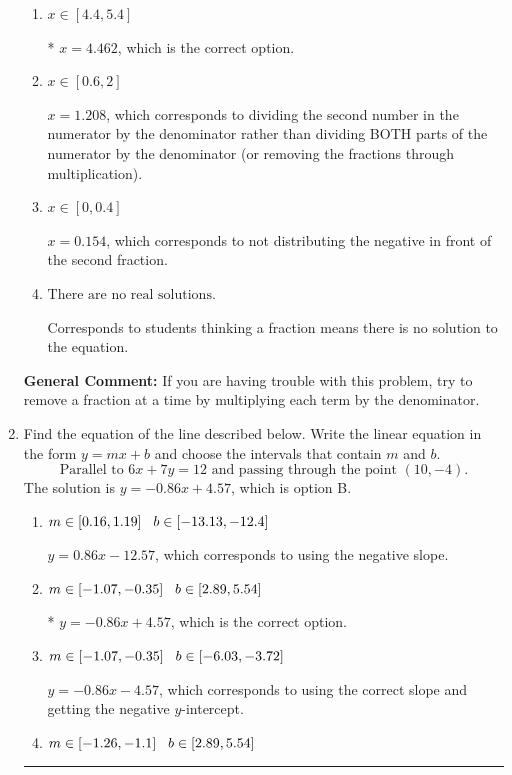 \documentclass{extbook}[14pt]
\newcommand{\litem}[1]{\item #1

\rule{\textwidth}{0.4pt}}
\begin{document}
\begin{enumerate}
{\begin{enumerate}[label=\Alph*.]
 $x = 8.308$, which corresponds to dividing the coefficients in front of x by the denominator rather than dividing BOTH parts of the numerator by the denominator (or removing the fractions through multiplication).
\item \( x \in [4.4, 5.4] \)

* $x = 4.462$, which is the correct option.
\item \( x \in [0.6, 2] \)

 $x = 1.208$, which corresponds to dividing the second number in the numerator by the denominator rather than dividing BOTH parts of the numerator by the denominator (or removing the fractions through multiplication).
\item \( x \in [0, 0.4] \)

 $x = 0.154$, which corresponds to not distributing the negative in front of the second fraction.
\item \( \text{There are no real solutions.} \)

Corresponds to students thinking a fraction means there is no solution to the equation.
\end{enumerate}

\textbf{General Comment:} If you are having trouble with this problem, try to remove a fraction at a time by multiplying each term by the denominator.
}
\litem{
Find the equation of the line described below. Write the linear equation in the form $ y=mx+b $ and choose the intervals that contain $m$ and $b$.
\[ \text{Parallel to } 6 x + 7 y = 12 \text{ and passing through the point } (10, -4). \]The solution is \( y = -0.86x + 4.57 \), which is option B.\begin{enumerate}[label=\Alph*.]
\item \( m \in [0.16, 1.19] \hspace*{3mm} b \in [-13.13, -12.4] \)

 $y = 0.86x - 12.57$, which corresponds to using the negative slope.
\item \( m \in [-1.07, -0.35] \hspace*{3mm} b \in [2.89, 5.54] \)

* $y = -0.86x + 4.57$, which is the correct option.
\item \( m \in [-1.07, -0.35] \hspace*{3mm} b \in [-6.03, -3.72] \)

 $y = -0.86x - 4.57$, which corresponds to using the correct slope and getting the negative $y$-intercept.
\item \( m \in [-1.26, -1.1] \hspace*{3mm} b \in [2.89, 5.54] \)


\end{enumerate}}
\end{enumerate}
\end{document}
